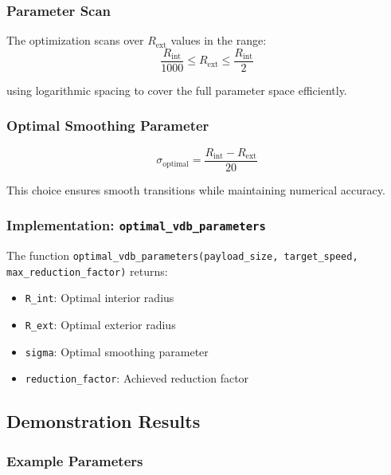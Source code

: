 \subsubsection{Parameter Scan}

The optimization scans over $R_{\text{ext}}$ values in the range:
\begin{equation}
\frac{R_{\text{int}}}{1000} \leq R_{\text{ext}} \leq \frac{R_{\text{int}}}{2}
\end{equation}

using logarithmic spacing to cover the full parameter space efficiently.

\subsubsection{Optimal Smoothing Parameter}

\begin{equation}
\sigma_{\text{optimal}} = \frac{R_{\text{int}} - R_{\text{ext}}}{20}
\end{equation}

This choice ensures smooth transitions while maintaining numerical accuracy.

\subsubsection{Implementation: \texttt{optimal\_vdb\_parameters}}

The function \texttt{optimal\_vdb\_parameters(payload\_size, target\_speed, max\_reduction\_factor)} returns:

\begin{itemize}
\item \texttt{R\_int}: Optimal interior radius
\item \texttt{R\_ext}: Optimal exterior radius
\item \texttt{sigma}: Optimal smoothing parameter
\item \texttt{reduction\_factor}: Achieved reduction factor
\end{itemize}

\subsection{Demonstration Results}

\subsubsection{Example Parameters}

